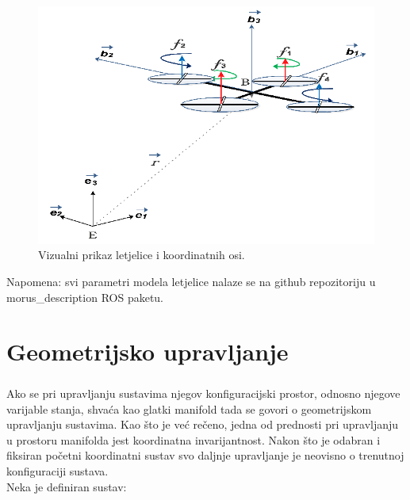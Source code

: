 \documentclass[times, utf8, diplomski]{fer}
\begin{document}
\begin{figure}[h!]
	\includegraphics[width=\textwidth]{figures/model.png}
	\caption{Vizualni prikaz letjelice i koordinatnih osi.}
\end{figure}
Napomena: svi parametri modela letjelice nalaze se na github repozitoriju u morus\_description ROS paketu.
\chapter{Geometrijsko upravljanje}
	
	\paragraph{}Ako se pri upravljanju sustavima njegov konfiguracijski prostor, odnosno njegove varijable stanja, shvaća kao glatki manifold tada se govori o geometrijskom upravljanju sustavima. Kao što je već rečeno, jedna od prednosti pri upravljanju u prostoru manifolda jest koordinatna invarijantnost. Nakon što je odabran i fiksiran početni koordinatni sustav svo daljnje upravljanje je neovisno o trenutnoj konfiguraciji sustava. \\
	Neka je definiran sustav:
	
\end{document}
